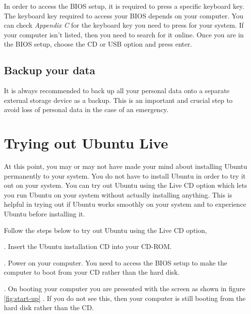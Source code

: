 \par \noindent In order to access the BIOS setup, it is required to press a specific keyboard key. The keyboard key required to access your BIOS depends on your computer. You can check \textit{Appendix C} for the keyboard key you need to press for your system. If your computer isn't listed, then you need to search for it online. Once you are in the BIOS setup, choose the CD or USB option and press enter.

\subsection*{Backup your data}
It is always recommended to back up all your personal data onto a separate external storage device as a backup. This is an important and crucial step to avoid loss of personal data in the case of an emergency.

\newpage
\section{Trying out Ubuntu Live} \label{sect:live-ubuntu}
At this point, you may or may not have made your mind about installing Ubuntu permanently to your system. You do not have to install Ubuntu in order to try it out on your system. You can try out Ubuntu using the Live CD option which lets you run Ubuntu on your system without actually installing anything. This is helpful in trying out if Ubuntu works smoothly on your system and to experience Ubuntu before installing it. \\

\par \noindent Follow the steps below to try out Ubuntu using the Live CD option, \\

\par {}. Insert the Ubuntu installation CD into your CD-ROM. \\

\par {}. Power on your computer. You need to access the BIOS setup to make the computer to boot from your CD rather than the hard disk.  \\

\par {}. On booting your computer you are presented with the screen as shown in figure \ref{fig:start-up} . If you do not see this, then your computer is still booting from the hard disk rather than the CD. \\

